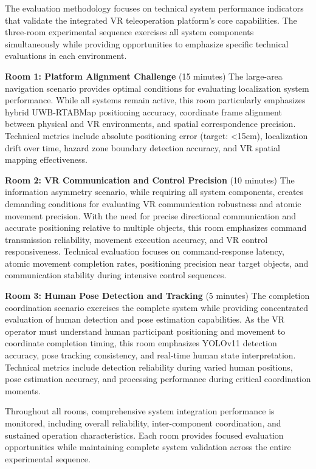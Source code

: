 The evaluation methodology focuses on technical system performance indicators that validate the integrated VR teleoperation platform's core capabilities. The three-room experimental sequence exercises all system components simultaneously while providing opportunities to emphasize specific technical evaluations in each environment.

\textbf{Room 1: Platform Alignment Challenge} (15 minutes)
The large-area navigation scenario provides optimal conditions for evaluating localization system performance. While all systems remain active, this room particularly emphasizes hybrid UWB-RTABMap positioning accuracy, coordinate frame alignment between physical and VR environments, and spatial correspondence precision. Technical metrics include absolute positioning error (target: <15cm), localization drift over time, hazard zone boundary detection accuracy, and VR spatial mapping effectiveness.

\textbf{Room 2: VR Communication and Control Precision} (10 minutes)
The information asymmetry scenario, while requiring all system components, creates demanding conditions for evaluating VR communication robustness and atomic movement precision. With the need for precise directional communication and accurate positioning relative to multiple objects, this room emphasizes command transmission reliability, movement execution accuracy, and VR control responsiveness. Technical evaluation focuses on command-response latency, atomic movement completion rates, positioning precision near target objects, and communication stability during intensive control sequences.

\textbf{Room 3: Human Pose Detection and Tracking} (5 minutes)
The completion coordination scenario exercises the complete system while providing concentrated evaluation of human detection and pose estimation capabilities. As the VR operator must understand human participant positioning and movement to coordinate completion timing, this room emphasizes YOLOv11 detection accuracy, pose tracking consistency, and real-time human state interpretation. Technical metrics include detection reliability during varied human positions, pose estimation accuracy, and processing performance during critical coordination moments.

Throughout all rooms, comprehensive system integration performance is monitored, including overall reliability, inter-component coordination, and sustained operation characteristics. Each room provides focused evaluation opportunities while maintaining complete system validation across the entire experimental sequence.

